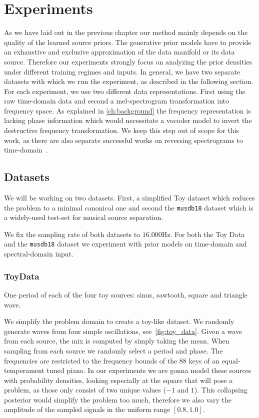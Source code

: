\chapter{Experiments}%
\label{ch:experiments}
As we have laid out in the previous chapter our method mainly depends on the quality of the learned source priors. The generative prior models have to provide an exhaustive and exclusive approximation of the data manifold or its data source. Therefore our experiments strongly focus on analyzing the prior densities under different training regimes and inputs. In general, we have two separate datasets with which we run the experiment, as described in the following section. For each experiment, we use two different data representations. First using the raw time-domain data and second a mel-spectrogram transformation into frequency space. As explained in \cref{ch:background} the frequency representation is lacking phase information which would necessitate a vocoder model to invert the destructive frequency transformation. We keep this step out of scope for this work, as there are also separate successful works on reversing spectrograms to time-domain~\cite{something about vocoders}.


\section{Datasets}
We will be working on two datasets. First, a simplified Toy dataset which reduces the problem to a minimal canonical one and second the \texttt{musdb18} dataset which is a widely-used test-set for musical source separation.

We fix the sampling rate of both datasets to \(16.000 \si{\Hz}\).
For both the Toy Data and the \texttt{musdb18} dataset we experiment with prior models on time-domain and spectral-domain input.

\subsection{ToyData}
\begin{marginfigure}[5em]
    \resizebox{\textwidth}{!}{%
    }%
    \caption{One period of each of the four toy sources: sinus, sawtooth, square and triangle wave.}%
    \label{fig:toy_data}
\end{marginfigure}

We simplify the problem domain to create a toy-like dataset. We randomly generate waves from four simple oscillations, see~\cref{fig:toy_data}. Given a wave from each source, the mix is computed by simply taking the mean. When sampling from each source we randomly select a period and phase. The frequencies are restricted to the frequency bounds of the 88 keys of an equal-temperament tuned piano. In our experiments we are gonna model these sources with probability densities, looking especially at the square that will pose a problem, as those only consist of two unique values (\(-1\) and \(1\)). This collapsing posterior would simplify the problem too much, therefore we also vary the amplitude of the sampled signals in the uniform range \([0.8, 1.0]\).

